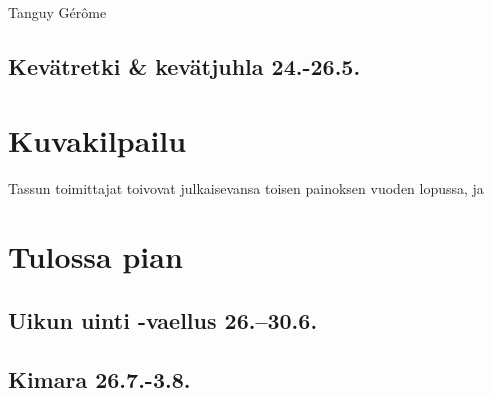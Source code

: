 \documentclass[10pt,finnish,a5paper,headings=small,twoside=semi]{scrartcl}
\begin{document}
\begin{multicols}{2}
\begin{center}
	\end{center}

	\columnbreak

	\medskip
	\noindent\null\hfill Tanguy Gérôme

\end{multicols}

\clearpage
\subsection{Kevätretki \& kevätjuhla 24.-26.5.}

\clearpage\section{Kuvakilpailu}

Tassun toimittajat toivovat julkaisevansa toisen painoksen vuoden lopussa, ja 

\clearpage\section{Tulossa pian}
\subsection{Uikun uinti -vaellus 26.–30.6.}
\subsection{Kimara 26.7.-3.8.}



\clearpage

\thispagestyle{empty}~

\vfill


{
	\noindent
	\begin{center}
	\end{center}
}
\end{document}
